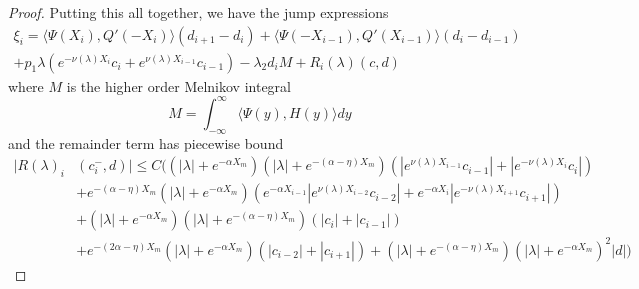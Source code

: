 \documentclass[thesis.tex]{subfiles}
\begin{document}
\begin{lemma}
\begin{proof}
Putting this all together, we have the jump expressions
\begin{align*}
\xi_i = \langle \Psi(X_i), Q'(-X_i) \rangle (d_{i+1} - d_i ) + \langle \Psi(-X_{i-1}), Q'(X_{i-1}) \rangle (d_i - d_{i-1} ) \\
+ p_1 \lambda( e^{-\nu(\lambda)X_i}c_i + e^{\nu(\lambda)X_{i-1}}c_{i-1})
- \lambda_2 d_i M + R_i(\lambda)(c, d)
\end{align*}
where $M$ is the higher order Melnikov integral
\[
M = \int_{-\infty}^\infty \langle \Psi(y), H(y) \rangle dy
\]
and the remainder term has piecewise bound
\begin{align*}
|R(\lambda)_i&(c_i^-, d)| \leq C \Big( (|\lambda| + e^{-\alpha X_m})(|\lambda| + e^{-(\alpha - \eta) X_m})(|e^{\nu(\lambda)X_{i-1}}c_{i-1}| + |e^{-\nu(\lambda)X_i}c_i|) \\
&+ e^{-(\alpha - \eta)X_m} (|\lambda| + e^{-\alpha X_m})(e^{-\alpha X_{i-1}} |e^{\nu(\lambda)X_{i-2}}c_{i-2}| + e^{-\alpha X_i} |e^{-\nu(\lambda)X_{i+1}}c_{i+1}|) \\
&+ (|\lambda| + e^{-\alpha X_m})(|\lambda| + e^{-(\alpha - \eta) X_m})(|c_i| + |c_{i-1}|) \\
&+ e^{-(2 \alpha - \eta)X_m} (|\lambda| + e^{-\alpha X_m})(|c_{i-2}| + |c_{i+1}|) 
+ (|\lambda| + e^{-(\alpha - \eta) X_m})(|\lambda| + e^{-\alpha X_m})^2 |d| \Big)
\end{align*}


\end{proof}
\end{lemma}
\end{document}
